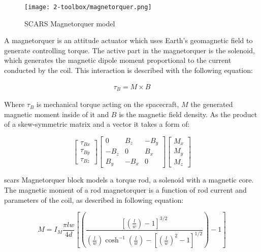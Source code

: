         \begin{figure}[H]
            \centering
            \texttt{[image: 2-toolbox/magnetorquer.png]}
            \caption{SCARS Magnetorquer model}
            \label{fig:magnetorquer}
        \end{figure}

        A magnetorquer is an attitude actuator which uses Earth's geomagnetic field to generate controlling torque. The active part in the magnetorquer is the solenoid, which generates the magnetic dipole moment proportional to the current conducted by the coil. This interaction is described with the following equation:

        \begin{align}
            \tau_B = M \times B
        \end{align}

        Where $\tau_B$ is mechanical torque acting on the spacecraft, $M$ the generated magnetic moment inside of it and $B$ is the magnetic field density. As the product of a skew-symmetric matrix and a vector it takes a form of:

        \begin{equation}
            \begin{bmatrix}
            \tau_{Bx}\\ 
            \tau_{By}\\ 
            \tau_{Bz}
            \end{bmatrix}
            \begin{bmatrix}
            0 & B_z & -B_y\\ 
            -B_z & 0 & B_x\\ 
            B_y & -B_x & 0
            \end{bmatrix}
            \begin{bmatrix}
            M_x\\
            M_y\\
            M_z
            \end{bmatrix}                
        \end{equation} %

        \ac{scars} Magnetorquer block models a torque rod, a solenoid with a magnetic core. The magnetic moment of a rod magnetorquer is a function of rod current and parameters of the coil, as described in following equation:

        \begin{equation}
            M = I_M\frac{\pi lw}{4d}\left[\left( \frac{\left[ \left( \frac{l}{w} \right) -1\right]^{3/2}}{\left( \frac{l}{w} \right)\cosh^{-1}\left( \frac{l}{w} \right)-\left[\left( \frac{l}{w} \right)^2 -1\right]^{1/2}} \right)- 1 \right]
        \end{equation}

